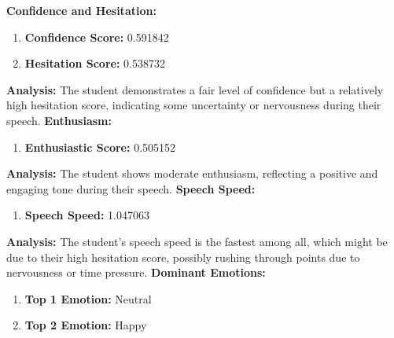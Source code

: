 \documentclass{article}
\begin{document}
\vspace{0.1in}
\large{\textbf{Confidence and Hesitation:}}
\begin{tcolorbox}[colback=green!10!white, colframe=green!80!black, title=Confidence and Hesitation Scores]
    \begin{enumerate}
        \item \textbf{Confidence Score:} \textcolor{green!50!black}{0.591842}
        \item \textbf{Hesitation Score:} \textcolor{red!70!black}{0.538732}
    \end{enumerate}
\end{tcolorbox}
    \textbf{Analysis:} The student demonstrates a fair level of confidence but a relatively high hesitation score, indicating some uncertainty or nervousness during their speech.
    \vspace{0.1in}
\large{\textbf{Enthusiasm:}}
\begin{tcolorbox}[colback=orange!10!white, colframe=orange!80!black, title=Enthusiastic Score]
    \begin{enumerate}
        \item \textbf{Enthusiastic Score:} \textcolor{orange!70!black}{0.505152}
    \end{enumerate}
\end{tcolorbox}
    \textbf{Analysis:} The student shows moderate enthusiasm, reflecting a positive and engaging tone during their speech.
    \vspace{0.1in}
\large{\textbf{Speech Speed:}}
\begin{tcolorbox}[colback=purple!10!white, colframe=purple!80!black, title=Speech Speed]
    \begin{enumerate}
        \item \textbf{Speech Speed:} \textcolor{purple!70!black}{1.047063}
    \end{enumerate}
\end{tcolorbox}
    \textbf{Analysis:} The student's speech speed is the fastest among all, which might be due to their high hesitation score, possibly rushing through points due to nervousness or time pressure.
    \vspace{0.1in}
\large{\textbf{Dominant Emotions:}}
\begin{tcolorbox}[colback=pink!10!white, colframe=pink!80!black, title=Emotional State]
    \begin{enumerate}
        \item \textbf{Top 1 Emotion:} \textcolor{blue!80!black}{Neutral}
        \item \textbf{Top 2 Emotion:} \textcolor{red!80!black}{Happy}
    \end{enumerate}
\end{tcolorbox}
\end{document}

